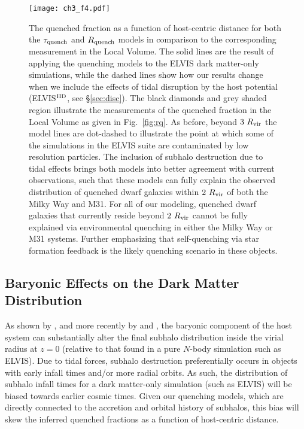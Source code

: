 
\begin{figure*}
 \centering
 \hspace*{-0.1in}
 \texttt{[image: ch3\_f4.pdf]}
 \caption{The quenched fraction as a function of host-centric distance for both
   the $\tau_{\rm quench}$ and $R_{\rm quench}$ models in comparison to the
   corresponding measurement in the Local Volume. The solid lines are the result
   of applying the quenching models to the ELVIS dark matter-only simulations,
   while the dashed lines show how our results change when we include the
   effects of tidal disruption by the host potential (ELVIS$^{\rm HD}$, see
   \S\ref{sec:disc}). The black diamonds and grey shaded region illustrate the
   measurements of the quenched fraction in the Local Volume as given in
   Fig.~\ref{fig:rq}.
   As before, beyond $3~R_{\rm{vir}}$ the model lines are dot-dashed to illustrate the
   point at which some of the simulations in the ELVIS suite are
   contaminated by low resolution particles.
   The inclusion of subhalo destruction due to tidal effects
   brings both models into better agreement with current observations, such that
   these models can fully explain the observed distribution of quenched dwarf
   galaxies within $2~R_{\rm{vir}}$ of both the Milky Way and M31.
   For all of our modeling, quenched dwarf galaxies that currently
   reside beyond $2~R_{\rm{vir}}$ cannot be fully explained via environmental
   quenching in either the Milky Way or M31 systems. Further
   emphasizing that self-quenching via star formation feedback is the
   likely quenching scenario in these objects. }
 \label{fig:destruct}
\end{figure*}





\subsection{Baryonic Effects on the Dark Matter Distribution}
\label{subsec:DES}

As shown by \citet{donghia10}, and more recently by \citet{gk17} and
\citet{sawala17}, the baryonic component of the host system can substantially
alter the final subhalo distribution inside the virial radius at $z=0$ (relative
to that found in a pure $N$-body simulation such as ELVIS).
%
Due to tidal forces, subhalo destruction preferentially occurs in objects with
early infall times and/or more radial orbits.
%
As such, the distribution of subhalo infall times for a dark matter-only
simulation (such as ELVIS) will be biased towards earlier cosmic times.
%
Given our quenching models, which are directly connected to the accretion
and orbital history of subhalos, this bias will skew the inferred quenched
fractions as a function of host-centric distance. 

